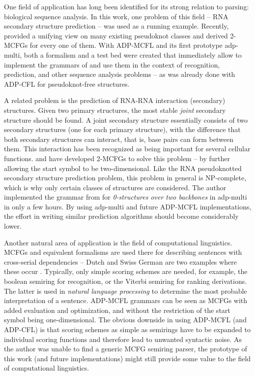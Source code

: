 \documentclass[
    a4paper,
    12pt,
    twoside,
    BCOR=12mm,
    parskip=half,
    chapterprefix,
    numbers=noenddot,
    bibliography=totoc
]{scrbook}
\begin{document}
One field of application has long been identified for its strong relation to parsing: biological sequence analysis. In this work, one problem of this field -- RNA secondary structure prediction -- was used as a running example. Recently, \citet{nebel_algebraic_2012} provided a unifying view on many existing pseudoknot classes and derived 2-\glspl{MCFG} for every one of them. With \gls{ADP-MCFL} and its first prototype adp-multi, both a formalism and a test bed were created that immediately allow to implement the grammars of \citeauthor{nebel_algebraic_2012} and use them in the context of recognition, prediction, and other sequence analysis problems -- as was already done with ADP-CFL for pseudoknot-free structures.

A related problem is the prediction of RNA-RNA interaction (secondary) structures. Given two primary structures, the most stable \emph{joint} secondary structure should be found. A joint secondary structure essentially consists of two secondary structures (one for each primary structure), with the difference that both secondary structures can interact, that is, base pairs can form between them. This interaction has been recognized as being important for several cellular functions. \citet{kato_grammatical_2009} and \citet{andersen_topology_2012} have developed 2-\glspl{MCFG} to solve this problem -- by further allowing the start symbol to be two-dimensional. Like the RNA pseudoknotted secondary structure prediction problem, this problem in general is NP-complete, which is why only certain classes of structures are considered. The author implemented the grammar from \citet{andersen_topology_2012} for \emph{0-structures over two backbones} in adp-multi in only a few hours. By using adp-multi and future ADP-MCFL implementations, the effort in writing similar prediction algorithms should become considerably lower.

Another natural area of application is the field of computational linguistics. \glspl{MCFG} and equivalent formalisms are used there for describing sentences with cross-serial dependencies -- Dutch and Swiss German are two examples where these occur \citep[cf.][sect. 1.1]{kallmeyer_parsing_2010}. Typically, only simple scoring schemes are needed, for example, the boolean semiring for recognition, or the Viterbi semiring for ranking derivations. The latter is used in \emph{natural language processing} to determine the most probable interpretation of a sentence. ADP-MCFL grammars can be seen as \glspl{MCFG} with added evaluation and optimization, and without the restriction of the start symbol being one-dimensional. The obvious downside in using ADP-MCFL (and ADP-CFL) is that scoring schemes as simple as semirings have to be expanded to individual scoring functions and therefore lead to unwanted syntactic noise. As the author was unable to find a generic \gls{MCFG} semiring parser, the prototype of this work (and future implementations) might still provide some value to the field of computational linguistics.
\end{document}
